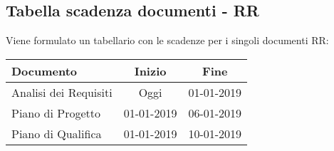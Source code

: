 	\subsection{Tabella scadenza documenti - RR}
	Viene formulato un tabellario con le scadenze per i singoli documenti RR:\\[0.5cm]
\begin{center}
	\renewcommand{\arraystretch}{2.0}
	\begin{tabular}{  l | c | c}
		\hline
		\textbf{Documento}&\textbf{Inizio}&\textbf{Fine}\\
		\hline
		 Analisi dei Requisiti & Oggi & 01-01-2019\\
		\hline
		Piano di Progetto & 01-01-2019 & 06-01-2019\\
		\hline
		Piano di Qualifica & 01-01-2019 & 10-01-2019\\
		\hline
	\end{tabular}
\end{center}
